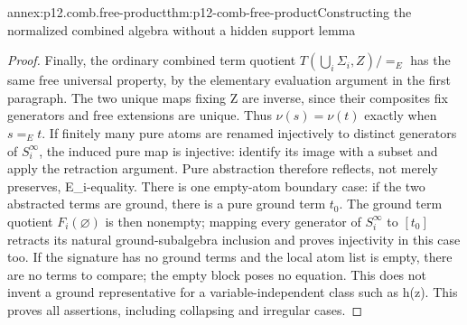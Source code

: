\begin{annexitem}{annex:p12.comb.free-product}{thm:p12-comb-free-product}{Constructing the normalized combined algebra without a hidden support lemma}
\begin{proof}
Finally, the ordinary combined term quotient \(T(\bigcup_i\Sigma_i,Z)/{=_E}\)
has the same free universal property, by the elementary evaluation
argument in the first paragraph. The two unique maps fixing Z are
inverse, since their composites fix generators and free extensions
are unique. Thus \(\nu(s)=\nu(t)\) exactly when \(s=_Et\).
If finitely many pure atoms are renamed injectively to distinct
generators of \(S_i^\infty\), the induced pure map is injective:
identify its image with a subset and apply the retraction argument.
Pure abstraction therefore reflects, not merely preserves,
E_i-equality. There is one empty-atom boundary case: if the two
abstracted terms are ground, there is a pure ground term \(t_0\).
The ground term quotient \(F_i(\varnothing)\) is then nonempty;
mapping every generator of \(S_i^\infty\) to \([t_0]\) retracts
its natural ground-subalgebra inclusion and proves injectivity in
this case too. If the signature has no ground terms and the local
atom list is empty, there are no terms to compare; the empty block
poses no equation. This does not invent a ground representative for
a variable-independent class such as h(z).
This proves all assertions, including collapsing and
irregular cases.
\end{proof}
\end{annexitem}

